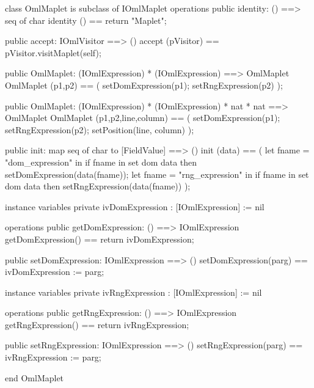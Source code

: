 \begin{vdm_al}
class OmlMaplet is subclass of IOmlMaplet
operations
  public identity: () ==> seq of char
  identity () == return "Maplet";

  public accept: IOmlVisitor ==> ()
  accept (pVisitor) == pVisitor.visitMaplet(self);

  public OmlMaplet:
    (IOmlExpression) *
    (IOmlExpression) ==> OmlMaplet
  OmlMaplet (p1,p2) == 
    ( setDomExpression(p1);
      setRngExpression(p2) );

  public OmlMaplet:
    (IOmlExpression) *
    (IOmlExpression) *
    nat *
    nat ==> OmlMaplet
  OmlMaplet (p1,p2,line,column) == 
    ( setDomExpression(p1);
      setRngExpression(p2);
      setPosition(line, column) );

  public init: map seq of char to [FieldValue] ==> ()
  init (data) ==
    ( let fname = "dom_expression" in
        if fname in set dom data
        then setDomExpression(data(fname));
      let fname = "rng_expression" in
        if fname in set dom data
        then setRngExpression(data(fname)) );

instance variables
  private ivDomExpression : [IOmlExpression] := nil

operations
  public getDomExpression: () ==> IOmlExpression
  getDomExpression() == return ivDomExpression;

  public setDomExpression: IOmlExpression ==> ()
  setDomExpression(parg) == ivDomExpression := parg;

instance variables
  private ivRngExpression : [IOmlExpression] := nil

operations
  public getRngExpression: () ==> IOmlExpression
  getRngExpression() == return ivRngExpression;

  public setRngExpression: IOmlExpression ==> ()
  setRngExpression(parg) == ivRngExpression := parg;

end OmlMaplet
\end{vdm_al}

